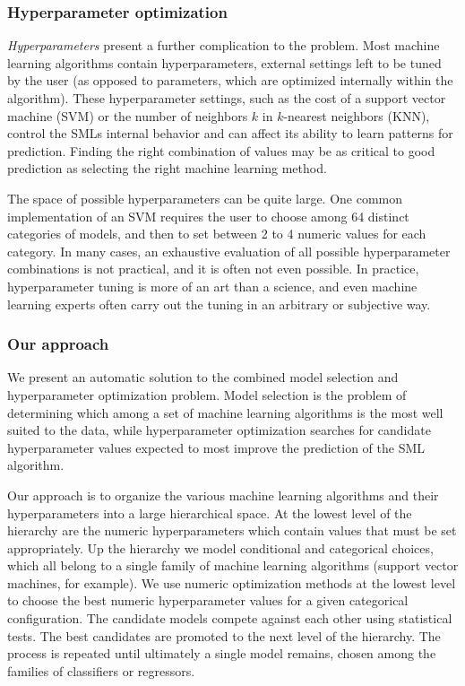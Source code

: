 \subsubsection{Hyperparameter optimization}

\emph{Hyperparameters} present a further complication to the problem. Most machine learning
algorithms contain hyperparameters, external settings left to be tuned by the user (as opposed to
parameters, which are optimized internally within the algorithm). These hyperparameter settings,
such as the cost of a support vector machine (SVM) or the number of neighbors $k$ in $k$-nearest
neighbors (KNN), control the SMLs internal behavior and can affect its ability to  learn patterns
for prediction. Finding the right combination of values may be as
critical to good prediction as selecting the right machine learning method.

The space of possible hyperparameters can be quite large. One common implementation of an SVM
requires the user to choose among 64 distinct categories of models, and then to set between 2 to 4
numeric values for each category. In many cases, an exhaustive evaluation of all possible
hyperparameter combinations is not practical, and it is often not even possible. In practice,
hyperparameter tuning is more of an art than a science, and even machine learning experts often
carry out the tuning in an arbitrary or subjective way.


\subsubsection{Our approach}

We present an automatic solution to the combined model selection and hyperparameter optimization problem. Model selection is the problem of determining which among a set of machine learning algorithms is the most well suited to the data, while hyperparameter optimization searches for candidate hyperparameter values expected to most improve the prediction of the SML algorithm.

Our approach is to organize the various machine learning algorithms and their hyperparameters into a large hierarchical space. At the lowest level of the hierarchy are the numeric hyperparameters which contain values that must be set appropriately. Up the hierarchy we model conditional and categorical choices, which all belong to a single family of machine learning algorithms (support vector machines, for example). We use numeric optimization methods at the lowest level to choose the best numeric hyperparameter values for a given categorical configuration. The candidate models compete against each other using statistical tests. The best candidates are promoted to the next level of the hierarchy. The process is repeated until ultimately a single model remains, chosen among the families of classifiers or regressors. 

